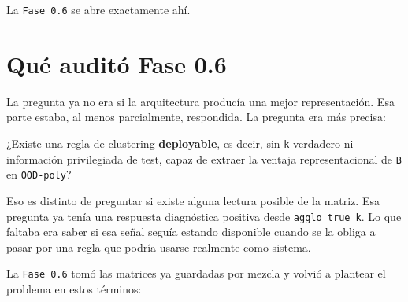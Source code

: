 \documentclass[11pt]{article}
\begin{document}
La \texttt{Fase 0.6} se abre exactamente ahí.

\section{Qué auditó Fase 0.6}

La pregunta ya no era si la arquitectura producía una mejor representación. Esa parte estaba, al menos parcialmente, respondida. La pregunta era más precisa:

\begin{goldbox}
¿Existe una regla de clustering \textbf{deployable}, es decir, sin \texttt{k} verdadero ni información privilegiada de test, capaz de extraer la ventaja representacional de \texttt{B} en \texttt{OOD-poly}?
\end{goldbox}

Eso es distinto de preguntar si existe alguna lectura posible de la matriz. Esa pregunta ya tenía una respuesta diagnóstica positiva desde \texttt{agglo\_true\_k}. Lo que faltaba era saber si esa señal seguía estando disponible cuando se la obliga a pasar por una regla que podría usarse realmente como sistema.

La \texttt{Fase 0.6} tomó las matrices ya guardadas por mezcla y volvió a plantear el problema en estos términos:

\begin{figure}[H]
\centering
{}
\end{figure}
\end{document}
